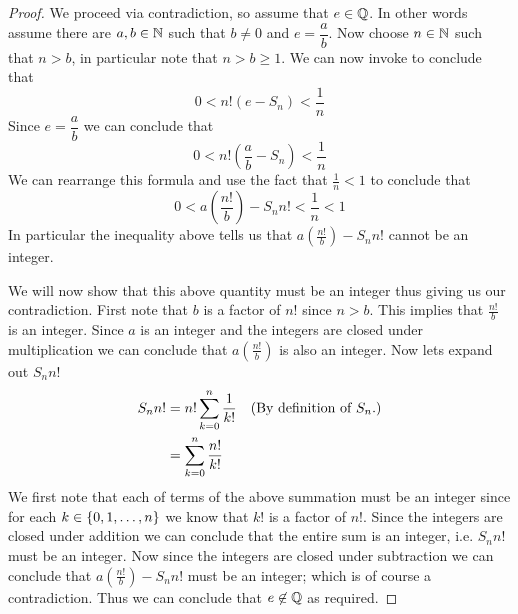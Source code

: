         \begin{proof}
            We proceed via contradiction, so assume that $e \in \mathbb{Q}$. In other
            words assume there are $a, b \in \mathbb{N}$ such that $b \neq 0$ and $e = \dfrac{a}{b}$.
            Now choose $n \in \mathbb{N}$ such that $n > b$, in particular note that $n > b \ge 1$.
            We can now invoke  to conclude that
            \begin{equation*}
                0 < n! (e - S_n) < \frac{1}{n}
            \end{equation*}
            Since $e = \dfrac{a}{b}$ we can conclude that
            \begin{equation*}
                0 < n! \left(\frac{a}{b} - S_n\right) < \frac{1}{n}
            \end{equation*}
            We can rearrange this formula and use the fact that $\frac{1}{n} < 1$ to conclude that
            \begin{equation}
                0 < a \left(\frac{n!}{b}\right) - S_n n! < \frac{1}{n} < 1
            \end{equation}
            In particular the inequality above tells us that $a \left(\frac{n!}{b}\right) - S_n n!$
            cannot be an integer.

            We will now show that this above quantity must be an integer thus giving us our contradiction.
            First note that $b$ is a factor of $n!$ since $n > b$.
            This implies that $\frac{n!}{b}$ is an integer. Since $a$ is an integer and the
            integers are closed under multiplication we can conclude that $a \left(\frac{n!}{b}\right)$
            is also an integer. Now lets expand out $S_n n!$
            \begin{align*}
                S_n n! &= n! \sum_{k = 0}^{n} \frac{1}{k!} & (\mbox{By definition of $S_n$.}) \\
                       &= \sum_{k = 0}^{n} \frac{n!}{k!} 
            \end{align*}
            We first note that each of terms of the above summation must be an integer since
            for each $k \in \left\{0, 1, \dots, n\right\}$ we know that $k!$ is a factor of $n!$. Since
            the integers are closed under addition we can conclude that the entire sum is an
            integer, i.e. $S_n n!$ must be an integer. Now since the integers are closed under
            subtraction we can conclude that $a\left(\frac{n!}{b}\right) - S_n n!$ must be an
            integer; which is of course a contradiction. Thus we can conclude that $e \not\in \mathbb{Q}$
            as required. \QED
        \end{proof}
